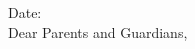 \documentclass[12pt,letterpaper]{article}
\author{Hilduara Abreu}
\begin{document}
\vspace*{1cm}
Date: \\

Dear Parents and Guardians,
\end{document}

